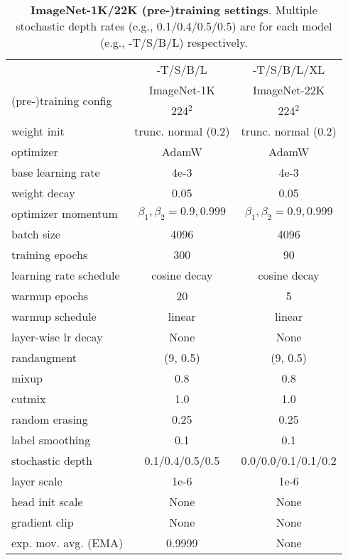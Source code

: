 \begin{table}[!htbp]
\small
\begin{tabular}{@{\hskip -0.05ex}l|c@{\hskip 1ex}c}
& \cnn{}-T/S/B/L & \cnn{}-T/S/B/L/XL \\
\multirow{2}{*}{(pre-)training config} & ImageNet-1K & ImageNet-22K \\
& 224$^2$ & 224$^2$ \\
\shline
weight init & trunc. normal (0.2) & trunc. normal (0.2) \\
optimizer & AdamW & AdamW\\
base learning rate & 4e-3 & 4e-3 \\
weight decay & 0.05 & 0.05 \\
optimizer momentum & $\beta_1, \beta_2{=}0.9, 0.999$ & $\beta_1, \beta_2{=}0.9, 0.999$ \\
batch size & 4096 & 4096 \\
training epochs & 300 & 90 \\
learning rate schedule & cosine decay & cosine decay \\
warmup epochs & 20 & 5 \\
warmup schedule & linear & linear \\
layer-wise lr decay \cite{Clark2020,Bao2021} & None & None \\
randaugment \cite{Cubuk2020} & (9, 0.5) & (9, 0.5) \\
mixup \cite{Zhang2018a} & 0.8 & 0.8 \\
cutmix \cite{Yun2019} & 1.0 & 1.0 \\
random erasing \cite{Zhong2020} & 0.25 & 0.25 \\
label smoothing \cite{Szegedy2016a} & 0.1 & 0.1 \\
stochastic depth \cite{Huang2016deep} & 0.1/0.4/0.5/0.5 & 0.0/0.0/0.1/0.1/0.2 \\
layer scale \cite{Touvron2021GoingDW} & 1e-6 & 1e-6 \\
head init scale \cite{Touvron2021GoingDW} & None & None \\
gradient clip & None & None \\
exp. mov. avg. (EMA) \cite{Polyak1992} & 0.9999 & None\\

\end{tabular}
\caption{\textbf{ImageNet-1K/22K (pre-)training settings}. Multiple stochastic depth rates (e.g., 0.1/0.4/0.5/0.5) are for each model (e.g., \cnn{}-T/S/B/L) respectively.}
\label{tab:train_detail}
\end{table}

